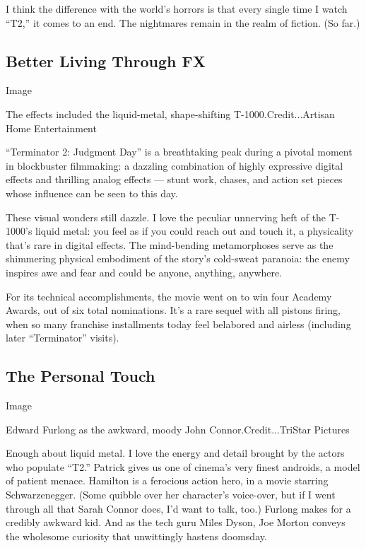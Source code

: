 I think the difference with the world's horrors is that every single
time I watch ``T2,'' it comes to an end. The nightmares remain in the
realm of fiction. (So far.)

\hypertarget{better-living-through-fx}{%
\subsection{Better Living Through FX}\label{better-living-through-fx}}

Image

The effects included the liquid-metal, shape-shifting
T-1000.Credit...Artisan Home Entertainment

``Terminator 2: Judgment Day'' is a breathtaking peak during a pivotal
moment in blockbuster filmmaking: a dazzling combination of highly
expressive digital effects and thrilling analog effects --- stunt work,
chases, and action set pieces whose influence can be seen to this day.

These visual wonders still dazzle. I love the peculiar unnerving heft of
the T-1000's liquid metal: you feel as if you could reach out and touch
it, a physicality that's rare in digital effects. The mind-bending
metamorphoses serve as the shimmering physical embodiment of the story's
cold-sweat paranoia: the enemy inspires awe and fear and could be
anyone, anything, anywhere.

For its technical accomplishments, the movie went on to win four Academy
Awards, out of six total nominations. It's a rare sequel with all
pistons firing, when so many franchise installments today feel belabored
and airless (including later ``Terminator'' visits).

\hypertarget{the-personal-touch}{%
\subsection{The Personal Touch}\label{the-personal-touch}}

Image

Edward Furlong as the awkward, moody John Connor.Credit...TriStar
Pictures

Enough about liquid metal. I love the energy and detail brought by the
actors who populate ``T2.'' Patrick gives us one of cinema's very finest
androids, a model of patient menace. Hamilton is a ferocious action
hero, in a movie starring Schwarzenegger. (Some quibble over her
character's voice-over, but if I went through all that Sarah Connor
does, I'd want to talk, too.) Furlong makes for a credibly awkward kid.
And as the tech guru Miles Dyson, Joe Morton conveys the wholesome
curiosity that unwittingly hastens doomsday.

